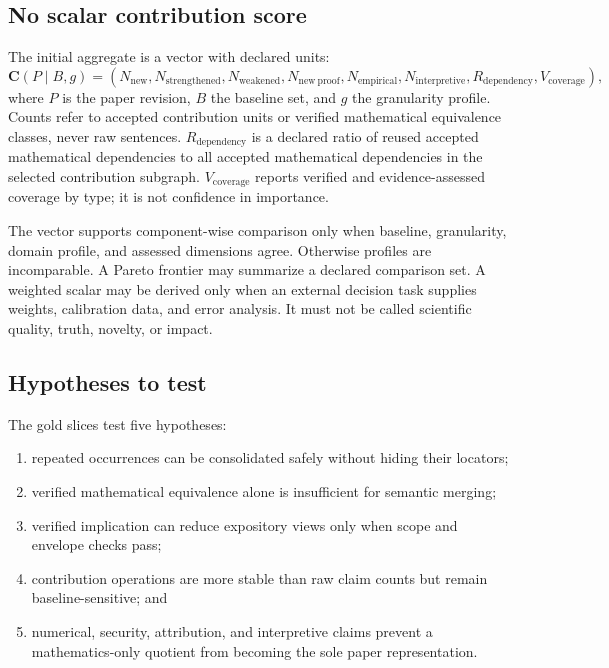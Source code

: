 \subsection{No scalar contribution score}

The initial aggregate is a vector with declared units:
\begin{equation}
\mathbf C(P\mid B,g)=
(N_{\mathrm{new}},N_{\mathrm{strengthened}},N_{\mathrm{weakened}},N_{\mathrm{new\ proof}},
N_{\mathrm{empirical}},N_{\mathrm{interpretive}},R_{\mathrm{dependency}},V_{\mathrm{coverage}}),
\end{equation}
where $P$ is the paper revision, $B$ the baseline set, and $g$ the granularity profile. Counts refer to accepted contribution units or verified mathematical equivalence classes, never raw sentences. $R_{\mathrm{dependency}}$ is a declared ratio of reused accepted mathematical dependencies to all accepted mathematical dependencies in the selected contribution subgraph. $V_{\mathrm{coverage}}$ reports verified and evidence-assessed coverage by type; it is not confidence in importance.

The vector supports component-wise comparison only when baseline, granularity, domain profile, and assessed dimensions agree. Otherwise profiles are incomparable. A Pareto frontier may summarize a declared comparison set. A weighted scalar may be derived only when an external decision task supplies weights, calibration data, and error analysis. It must not be called scientific quality, truth, novelty, or impact.

\subsection{Hypotheses to test}

The gold slices test five hypotheses:
\begin{enumerate}
  \item repeated occurrences can be consolidated safely without hiding their locators;
  \item verified mathematical equivalence alone is insufficient for semantic merging;
  \item verified implication can reduce expository views only when scope and envelope checks pass;
  \item contribution operations are more stable than raw claim counts but remain baseline-sensitive; and
  \item numerical, security, attribution, and interpretive claims prevent a mathematics-only quotient from becoming the sole paper representation.
\end{enumerate}